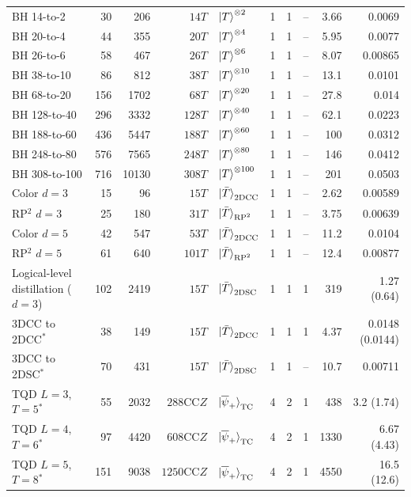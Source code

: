 \begin{table}[t]
\begin{ruledtabular}
\begin{tabular}{lrrrlrrrrr}
\hline
BH 14-to-2 & 30 & 206 & $14T$ & $\ket{T}^{\otimes 2}$ & 1 & 1 & -- & 3.66 & 0.0069 \\
BH 20-to-4 & 44 & 355 & $20T$ & $\ket{T}^{\otimes 4}$ & 1 & 1 & -- & 5.95 & 0.0077 \\
BH 26-to-6 & 58 & 467 & $26T$ & $\ket{T}^{\otimes 6}$ & 1 & 1 & -- & 8.07 & 0.00865 \\
BH 38-to-10 & 86 & 812 & $38T$ & $\ket{T}^{\otimes 10}$ & 1 & 1 & -- & 13.1 & 0.0101 \\
BH 68-to-20 & 156 & 1702 & $68T$ & $\ket{T}^{\otimes 20}$ & 1 & 1 & -- & 27.8 & 0.014 \\
BH 128-to-40 & 296 & 3332 & $128T$ & $\ket{T}^{\otimes 40}$ & 1 & 1 & -- & 62.1 & 0.0223 \\
BH 188-to-60 & 436 & 5447 & $188T$ & $\ket{T}^{\otimes 60}$ & 1 & 1 & -- & 100 & 0.0312 \\
BH 248-to-80 & 576 & 7565 & $248T$ & $\ket{T}^{\otimes 80}$ & 1 & 1 & -- & 146 & 0.0412 \\
BH 308-to-100 & 716 & 10130 & $308T$ & $\ket{T}^{\otimes 100}$ & 1 & 1 & -- & 201 & 0.0503 \\
Color $d=3$ & 15 & 96 & $15T$ & $\ket{\bar{T}}_{\text{2DCC}}$ & 1 & 1 & -- & 2.62 & 0.00589 \\
RP$^2$ $d=3$ & 25 & 180 & $31T$ & $\ket{\bar{T}}_{\text{RP}^2}$ & 1 & 1 & -- & 3.75 & 0.00639 \\
Color $d=5$ & 42 & 547 & $53T$ & $\ket{\bar{T}}_{\text{2DCC}}$ & 1 & 1 & -- & 11.2 & 0.0104 \\
RP$^2$ $d=5$ & 61 & 640 & $101T$ & $\ket{\bar{T}}_{\text{RP}^2}$ & 1 & 1 & -- & 12.4 & 0.00877 \\
Logical-level distillation ($d=3$) & 102 & 2419 & $15T$ & $\ket{\bar{T}}_{\text{2DSC}}$ & 1 & 1 & 1 & 319 & 1.27 (0.64) \\
3DCC to 2DCC$^*$ & 38 & 149 & $15T$ & $\ket{\bar{T}}_{\text{2DCC}}$ & 1 & 1 & 1 & 4.37 & 0.0148 (0.0144) \\
3DCC to 2DSC$^*$ & 70 & 431 & $15T$ & $\ket{\bar{T}}_{\text{2DSC}}$ & 1 & 1 & -- & 10.7 & 0.00711 \\
TQD $L=3$, $T=5$$^*$ & 55 & 2032 & $288\mathrm{CC}Z$ & $\ket{\overline\psi_+}_{\text{TC}}$ & 4 & 2 & 1 & 438 & 3.2 (1.74) \\
TQD $L=4$, $T=6$$^*$ & 97 & 4420 & $608\mathrm{CC}Z$ & $\ket{\overline\psi_+}_{\text{TC}}$ & 4 & 2 & 1 & 1330 & 6.67 (4.43) \\
TQD $L=5$, $T=8$$^*$ & 151 &9038 & $1250\mathrm{CC}Z$ & $\ket{\overline\psi_+}_{\text{TC}}$ & 4 & 2 & 1 & 4550 & 16.5 (12.6) \\
\end{tabular}
\end{ruledtabular}
\end{table}
